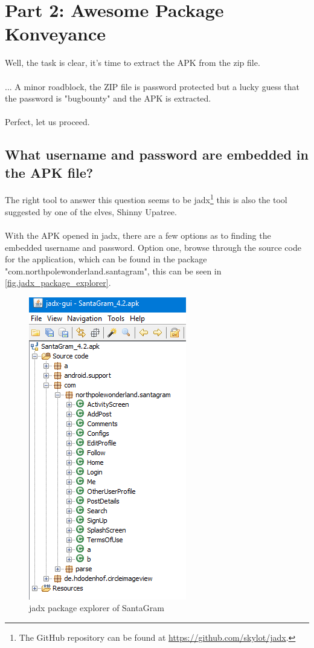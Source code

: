 \documentclass[writeup.tex]{subfiles}
\begin{document}
\section{Part 2: Awesome Package Konveyance} \label{section.part2}
	Well, the task is clear, it's time to extract the APK from the zip file.\\
	\\
	... A minor roadblock, the ZIP file is password protected but a lucky guess that the password is "bugbounty" and the APK is extracted.\\
	\\
	Perfect, let us proceed.
	
	\subsection{What username and password are embedded in the APK file?}
		The right tool to answer this question seems to be jadx\footnote{The GitHub repository can be found at \url{https://github.com/skylot/jadx}.} this is also the tool suggested by one of the elves, Shinny Upatree.\\
		\\
		With the APK opened in jadx, there are a few options as to finding the embedded username and password. Option one, browse through the source code for the application, which can be found in the package "com.northpolewonderland.santagram", this can be seen in \autoref{fig.jadx_package_explorer}.
		
		\begin{figure}[H]
			\centering
			\includegraphics[scale=.7]{screenshots/jadx_package_explorer}
			\caption{jadx package explorer of SantaGram}
			\label{fig.jadx_package_explorer}
		\end{figure}
		
\end{document}
